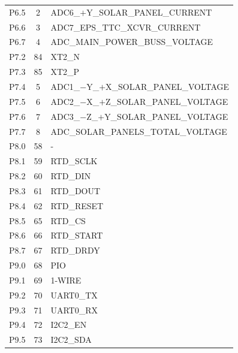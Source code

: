 \begin{longtable}{lcl}
    P6.5              & 2                   & ADC6\_$+$Y\_SOLAR\_PANEL\_CURRENT \\
    P6.6              & 3                   & ADC7\_EPS\_TTC\_XCVR\_CURRENT \\
    P6.7              & 4                   & ADC\_MAIN\_POWER\_BUSS\_VOLTAGE \\
    \midrule
    P7.2              & 84                  & XT2\_N                \\
    P7.3              & 85                  & XT2\_P                \\
    P7.4              & 5                   & ADC1\_$-$Y\_$+$X\_SOLAR\_PANEL\_VOLTAGE \\
    P7.5              & 6                   & ADC2\_$-$X\_$+$Z\_SOLAR\_PANEL\_VOLTAGE \\
    P7.6              & 7                   & ADC3\_$-$Z\_$+$Y\_SOLAR\_PANEL\_VOLTAGE \\
    P7.7              & 8                   & ADC\_SOLAR\_PANELS\_TOTAL\_VOLTAGE \\
    \midrule
    P8.0              & 58                  & -                     \\
    P8.1              & 59                  & RTD\_SCLK             \\
    P8.2              & 60                  & RTD\_DIN              \\
    P8.3              & 61                  & RTD\_DOUT             \\
    P8.4              & 62                  & RTD\_RESET            \\
    P8.5              & 65                  & RTD\_CS               \\
    P8.6              & 66                  & RTD\_START            \\
    P8.7              & 67                  & RTD\_DRDY             \\
    \midrule
    P9.0              & 68                  & PIO                   \\
    P9.1              & 69                  & 1-WIRE                \\
    P9.2              & 70                  & UART0\_TX             \\
    P9.3              & 71                  & UART0\_RX             \\
    P9.4              & 72                  & I2C2\_EN              \\
    P9.5              & 73                  & I2C2\_SDA             \\

\end{longtable}
